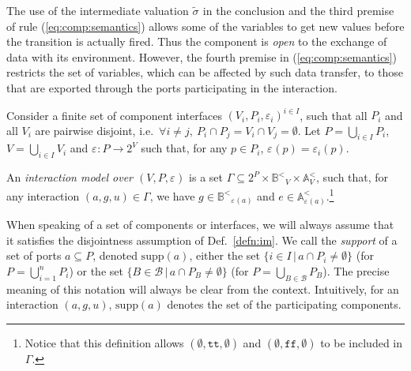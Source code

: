 \documentclass{llncs}
\newcommand{\Simon}{\\\hfill\mdash Simon}
\newcommand{\noteSB}[2][color=green!40, size=\tiny]{\todo[#1]{{#2}\Simon}}
\newcommand{\Ludo}{\\\hfill\mdash Ludo}
\newcommand{\noteLH}[2][color=orange!40, size=\tiny]{\todo[#1]{{#2}\Ludo}}
\newcommand{\defn}[1]{Def.~\ref{defn:#1}}
\newcommand{\eq}[1]{(\ref{eq:#1})}
\newcommand{\sA}{\ensuremath{\mathbb{A}}}
\newcommand{\cB}{\ensuremath{\mathcal{B}}}
\newcommand{\sB}{\ensuremath{\mathbb{B}}}
\newcommand{\mdash}[1][]{---#1}
\newcommand{\ie}[1][\ ]{i.e.#1}
\newcommand{\bydef}[1]{\ensuremath{\stackrel{\mathit{\scriptscriptstyle def}}{#1}}}
\newcommand{\setdef}[2]{\ensuremath{\{{#1}\,|\,{#2}\}}}
\newcommand{\true} {\ensuremath{\mathtt{t\!t}}}
\newcommand{\false}{\ensuremath{\mathtt{f\!f}}}
\newcommand{\noop} {\ensuremath{\emptyset}} %
\newcommand{\order}{<}
\newcommand{\ordbool}{\ensuremath{\sB^{\order}}}
\newcommand{\guards}[1]{\ensuremath{\ordbool_{#1}}}
\newcommand{\updates}[1]{\ensuremath{\sA^{\order}_{#1}}}
\newcommand{\val}[3][]{\ensuremath{#1{\sigma}^{#2}_{#3}}}
\newcommand{\export}[1][]{\ensuremath{\varepsilon_{#1}}}
\newcommand{\supp}[1]{\ensuremath{\mathrm{supp}(#1)}}
\begin{document}
The use of the intermediate valuation $\tilde{\val{}{}}$ in the
conclusion and the third premise of rule \eq{comp:semantics}
allows some of the variables to get new values before the
transition is actually fired.  Thus the component is \emph{open}
to the exchange of data with its environment.  However, the
fourth premise in \eq{comp:semantics} restricts the set of
variables, which can be affected by such data transfer, to those
that are exported through the ports participating in the
interaction.

\begin{definition}
  \label{defn:im}
  Consider a finite set of component interfaces $(V_i, P_i,
  \export[i])^{i \in I}$, such that all $P_i$ and all $V_i$ are
  pairwise disjoint, \ie $\forall i \neq j,\ P_i \cap P_j = V_i \cap
  V_j = \emptyset$.  Let $P = \bigcup_{i \in I} P_i$, $V = \bigcup_{i
    \in I} V_i$ and $\export : P \rightarrow 2^V$ such that, for any
  $p \in P_i$, $\export(p) = \export[i](p)$. 
%

  An \emph{interaction model over $(V, P, \export)$} is a set $\Gamma
  \subseteq 2^P \times \guards{V} \times \updates{V}$, such that,
  for any interaction $(a, g, u) \in \Gamma$, we have
  $g \in \guards{\export(a)}$ and $e \in \updates{\export(a)}$.\footnote{%
%
    Notice that this definition allows $(\emptyset, \true,
    \noop)$ and $(\emptyset, \false, \noop)$ to be included in
    $\Gamma$.
%
  }
\end{definition}

When speaking of a set of components or interfaces, we will always
assume that it satisfies the disjointness assumption of \defn{im}.
%
We call the \emph{support} of a set of ports $a \subseteq P$, denoted
$\supp{a}$, either the set $\setdef{i \in I}{a \cap P_i \neq
  \emptyset}$ (for $P = \bigcup_{i=1}^n P_i$) or the set $\setdef{B
  \in \cB}{a \cap P_B \neq \emptyset}$ (for $P = \bigcup_{B \in \cB}
P_B$).  The precise meaning of this notation will always be clear from
the context.  Intuitively, for an interaction $(a, g, u)$, $\supp{a}$
denotes the set of the participating components.
\end{document}
